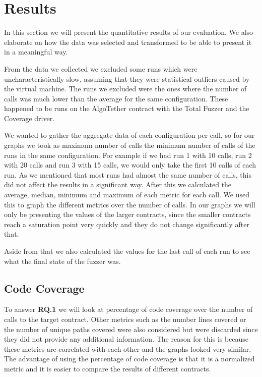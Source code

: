 \section{Results}
In this section we will present the quantitative results of our evaluation.
We also elaborate on how the data was selected and transformed to be able to present it in a meaningful way.

From the data we collected we excluded some runs which were uncharacteristically slow, assuming that they were statistical outliers caused by the virtual machine.
The runs we excluded were the ones where the number of calls was much lower than the average for the same configuration.
These happened to be runs on the AlgoTether contract with the Total Fuzzer and the Coverage driver.

We wanted to gather the aggregate data of each configuration per call, so for our graphs we took as maximum number of calls the minimum number of calls of the runs in the same configuration.
For example if we had run 1 with 10 calls, run 2 with 20 calls and run 3 with 15 calls, we would only take the first 10 calls of each run.
As we mentioned that most runs had almost the same number of calls, this did not affect the results in a significant way.
After this we calculated the average, median, minimum and maximum of each metric for each call.
We used this to graph the different metrics over the number of calls.
In our graphs we will only be presenting the values of the larger contracts, since the smaller contracts reach a saturation point very quickly and they do not change significantly after that.

Aside from that we also calculated the values for the last call of each run to see what the final state of the fuzzer was.

\subsection*{Code Coverage}
To answer \textbf{RQ.1} we will look at percentage of code coverage over the number of calls to the target contract.
Other metrics such as the number lines covered or the number of unique paths covered were also considered but were discarded since they did not provide any additional information.
The reason for this is because these metrics are correlated with each other and the graphs looked very similar.
The advantage of using the percentage of code coverage is that it is a normalized metric and it is easier to compare the results of different contracts.


